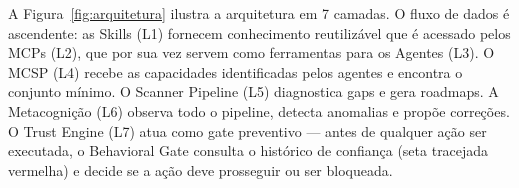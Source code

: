 A Figura~\ref{fig:arquitetura} ilustra a arquitetura em 7 camadas. O fluxo de dados é ascendente: as Skills (L1) fornecem conhecimento reutilizável que é acessado pelos MCPs (L2), que por sua vez servem como ferramentas para os Agentes (L3). O MCSP (L4) recebe as capacidades identificadas pelos agentes e encontra o conjunto mínimo. O Scanner Pipeline (L5) diagnostica gaps e gera roadmaps. A Metacognição (L6) observa todo o pipeline, detecta anomalias e propõe correções. O Trust Engine (L7) atua como gate preventivo — antes de qualquer ação ser executada, o Behavioral Gate consulta o histórico de confiança (seta tracejada vermelha) e decide se a ação deve prosseguir ou ser bloqueada.
